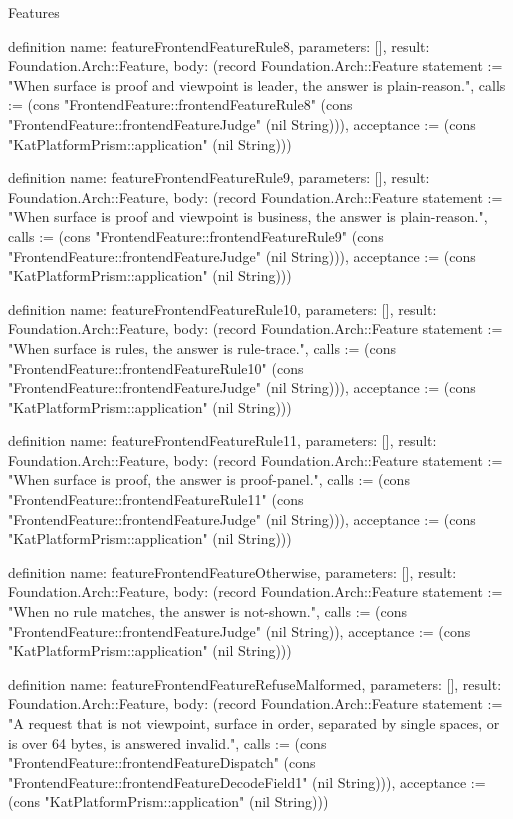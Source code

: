 \begin{lexlean}{Features}
\begin{semanticmodule}
definition{
  name: featureFrontendFeatureRule8,
  parameters: [],
  result: Foundation.Arch::Feature,
  body: (record Foundation.Arch::Feature {statement := "When surface is proof and viewpoint is leader, the answer is plain-reason.", calls := (cons "FrontendFeature::frontendFeatureRule8" (cons "FrontendFeature::frontendFeatureJudge" (nil String))), acceptance := (cons "KatPlatformPrism::application" (nil String))})
}

definition{
  name: featureFrontendFeatureRule9,
  parameters: [],
  result: Foundation.Arch::Feature,
  body: (record Foundation.Arch::Feature {statement := "When surface is proof and viewpoint is business, the answer is plain-reason.", calls := (cons "FrontendFeature::frontendFeatureRule9" (cons "FrontendFeature::frontendFeatureJudge" (nil String))), acceptance := (cons "KatPlatformPrism::application" (nil String))})
}

definition{
  name: featureFrontendFeatureRule10,
  parameters: [],
  result: Foundation.Arch::Feature,
  body: (record Foundation.Arch::Feature {statement := "When surface is rules, the answer is rule-trace.", calls := (cons "FrontendFeature::frontendFeatureRule10" (cons "FrontendFeature::frontendFeatureJudge" (nil String))), acceptance := (cons "KatPlatformPrism::application" (nil String))})
}

definition{
  name: featureFrontendFeatureRule11,
  parameters: [],
  result: Foundation.Arch::Feature,
  body: (record Foundation.Arch::Feature {statement := "When surface is proof, the answer is proof-panel.", calls := (cons "FrontendFeature::frontendFeatureRule11" (cons "FrontendFeature::frontendFeatureJudge" (nil String))), acceptance := (cons "KatPlatformPrism::application" (nil String))})
}

definition{
  name: featureFrontendFeatureOtherwise,
  parameters: [],
  result: Foundation.Arch::Feature,
  body: (record Foundation.Arch::Feature {statement := "When no rule matches, the answer is not-shown.", calls := (cons "FrontendFeature::frontendFeatureJudge" (nil String)), acceptance := (cons "KatPlatformPrism::application" (nil String))})
}

definition{
  name: featureFrontendFeatureRefuseMalformed,
  parameters: [],
  result: Foundation.Arch::Feature,
  body: (record Foundation.Arch::Feature {statement := "A request that is not viewpoint, surface in order, separated by single spaces, or is over 64 bytes, is answered invalid.", calls := (cons "FrontendFeature::frontendFeatureDispatch" (cons "FrontendFeature::frontendFeatureDecodeField1" (nil String))), acceptance := (cons "KatPlatformPrism::application" (nil String))})
}


\end{semanticmodule}
\end{lexlean}
